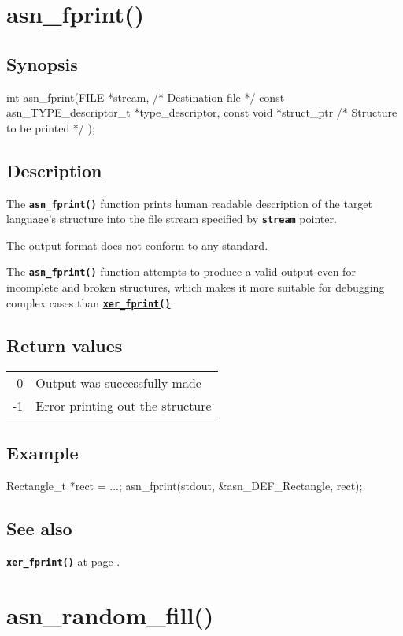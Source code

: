 \documentclass[english,oneside,12pt]{book}
\newcommand{\apisection}[2]{\clearpage\section{\label{#1}#2}}
\newcommand{\api}[2]{\hyperref[#1]{\code{#2}}}
\newcommand{\seealso}[2]{\api{#1}{#2} at page \pageref{#1}}
\newcommand{\code}[1]{\texttt{\textbf{\lstinline{#1}}}}
\begin{document}
\apisection{sec:asn_fprint}{asn\_fprint()}

\subsection*{Synopsis}
\begin{signature}
int asn_fprint(FILE *stream,    /* Destination file */
    const asn_TYPE_descriptor_t *type_descriptor,
    const void *struct_ptr      /* Structure to be printed */
);
\end{signature}

\subsection*{Description}

The \code{asn_fprint()} function prints human readable description
of the target language's structure into the file stream specified by
\code{stream} pointer.

The output format does not conform to any standard.

The \code{asn_fprint()} function attempts to
produce a valid output even for incomplete and broken structures, which
makes it more suitable for debugging complex cases than
\api{sec:xer_fprint}{xer_fprint()}.

\subsection*{Return values}

\begin{tabular}[h!]{rl}
0 & Output was successfully made \\
-1 & Error printing out the structure
\end{tabular}

\subsection*{Example}
\begin{example}
Rectangle_t *rect = ...;
asn_fprint(stdout, &asn_DEF_Rectangle, rect);
\end{example}

\subsection*{See also}
\seealso{sec:xer_fprint}{xer_fprint()}.

\apisection{sec:asn_random_fill}{asn\_random\_fill()}
\end{document}
